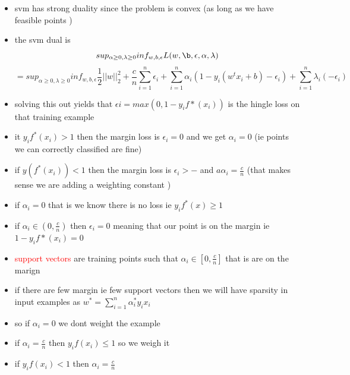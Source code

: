 \documentclass{article}
\begin{document}
\begin{itemize}
\item svm has strong duality since the problem is convex (as long as we have  feasible points )
\item the svm dual is $$sup_{\alpha\geq 0, \lambda \geq 0}inf_{w,b, \epsilon}L(w,\b , \epsilon, \alpha, \lambda )$$ $$=sup_{\alpha\geq 0, \lambda \geq 0}inf_{w,b, \epsilon}\frac{1}{2}||w||_{2}^{2}+\frac{c}{n}\sum_{i=1}^{n}\epsilon_{i}+\sum_{i=1}^{n}\alpha_{i}(1-y_i(w^tx_i+b)-\epsilon_i)+\sum_{i=1}^{n}\lambda_i(-\epsilon_i) $$
\item solving this out yields that $\epsilon{i}=max(0,1-y_if*(x_i))$ is the hingle loss on that training example 
\item it $y_if^{*}(x_i)>1$ then the margin loss is $\epsilon_{i}=0$ and we get $\alpha_{i}=0$ (ie points we can correctly classified are fine)
\item if $y(f^{*}(x_i))<1$ then the margin loss is $\epsilon_i>-$ and $a\alpha_{i}=\frac{c}{n}$ (that makes sense we are adding a weighting constant )
\item if $\alpha_i=0$ that is we know there is no loss ie $y_if^{*}(x)\geq 1$
\item if $\alpha_{i}\in (0,\frac{c}{n})$ then $\epsilon_{i}=0$ meaning that our point is on the margin ie $1-y_if*(x_i)=0$
\item \textcolor{red}{support vectors} are training points such that $\alpha_{i}\in [0,\frac{c}{n}]$ that is are on the marign 
\item if there are few margin ie few support vectors  then we will have sparsity in input examples as $w^{*}=\sum_{i=1}^{n}\alpha_{i}^{*}y_ix_i$ 
\item so if $\alpha_i=0$ we dont weight the example 
\item if $\alpha_{i}=\frac{c}{n}$ then $y_if(x_i)\leq 1$ so we weigh it 
\item if $y_if(x_i)<1 $ then $\alpha_{i}=\frac{c}{n}$
\end{itemize}
\end{document}
